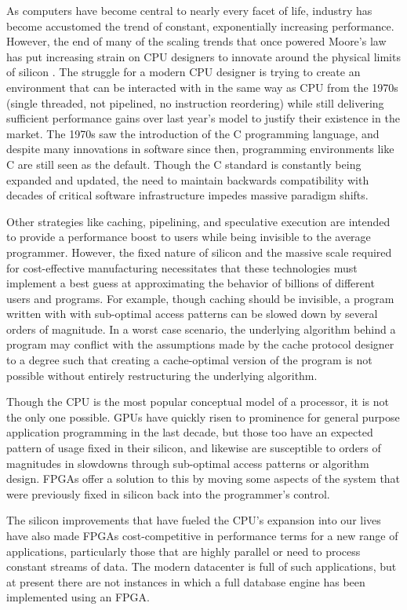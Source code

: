 
As computers have become central to nearly every facet of life, industry has
become accustomed the trend of constant, exponentially increasing performance.
However, the end of many of the scaling trends that once powered Moore's law has
put increasing strain on CPU designers to innovate around the physical limits of
silicon \autocite{dark-silicon}.
%
The struggle for a modern CPU designer is trying to create an environment that
can be interacted with in the same way as CPU from the 1970s (single threaded, not
pipelined, no instruction reordering) while still delivering sufficient
performance gains over last year's model to justify their existence in the
market. The 1970s saw the introduction of the C programming language, and
despite many innovations in software since then, programming environments like C
are still seen as the default. Though the C standard is constantly being
expanded and updated, the need to maintain backwards compatibility with decades
of critical software infrastructure impedes massive paradigm shifts.

Other strategies like caching, pipelining, and speculative execution are
intended to provide a performance boost to users while being invisible to the
average programmer. However, the fixed nature of silicon and the massive scale
required for cost-effective manufacturing necessitates that these technologies
must implement a best guess at approximating the behavior of billions of
different users and programs.
%
For example, though caching should be invisible, a program written with with
sub-optimal access patterns can be slowed down by several orders of magnitude.
In a worst case scenario, the underlying algorithm behind a program may conflict
with the assumptions made by the cache protocol designer to a degree such that
creating a cache-optimal version of the program is not possible without entirely
restructuring the underlying algorithm.

Though the CPU is the most popular conceptual model of a processor, it is
not the only one possible. GPUs have quickly risen to prominence for general
purpose application programming in the last decade, but those too have an
expected pattern of usage fixed in their silicon, and likewise are susceptible
to orders of magnitudes in slowdowns through sub-optimal access patterns or
algorithm design. FPGAs offer a solution to this by moving some aspects of the
system that were previously fixed in silicon back into the programmer's control.

The silicon improvements that have fueled the CPU's expansion into our lives
have also made FPGAs cost-competitive in performance terms for a new range of
applications, particularly those that are highly parallel or need to
process constant streams of data. The modern datacenter is full of such
applications, but at present there are not instances in which a full database
engine has been implemented using an FPGA.
